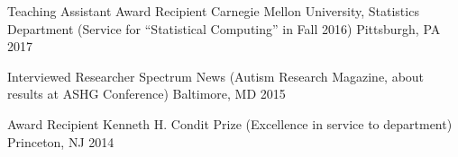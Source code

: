 

%

\begin{cvhonors}

\cvhonor
    {Teaching Assistant Award Recipient} %
    {Carnegie Mellon University, Statistics Department (Service for ``Statistical Computing'' in Fall 2016)} %
    {Pittsburgh, PA} %
    {2017} %


  \cvhonor
    {Interviewed Researcher} %
    {Spectrum News (Autism Research Magazine, about results at ASHG Conference)} %
    {Baltimore, MD} %
    {2015} %

  \cvhonor
    {Award Recipient} %
    {Kenneth H. Condit Prize (Excellence in service to department)} %
    {Princeton, NJ} %
    {2014} %

\end{cvhonors}
